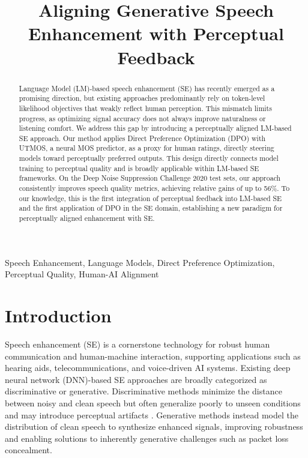 \documentclass{article}
\title{Aligning Generative Speech Enhancement with Perceptual Feedback}
\begin{document}
\ninept

\maketitle

\begin{abstract}
Language Model (LM)-based speech enhancement (SE) has recently emerged as a promising direction, but existing approaches predominantly rely on token-level likelihood objectives that weakly reflect human perception. This mismatch limits progress, as optimizing signal accuracy does not always improve naturalness or listening comfort. We address this gap by introducing a perceptually aligned LM-based SE approach. Our method applies Direct Preference Optimization (DPO) with UTMOS, a neural MOS predictor, as a proxy for human ratings, directly steering models toward perceptually preferred outputs. This design directly connects model training to perceptual quality and is broadly applicable within LM-based SE frameworks. On the Deep Noise Suppression Challenge 2020 test sets, our approach consistently improves speech quality metrics, achieving relative gains of up to 56\%. To our knowledge, this is the first integration of perceptual feedback into LM-based SE and the first application of DPO in the SE domain, establishing a new paradigm for perceptually aligned enhancement with SE.
\end{abstract}
%
\begin{keywords}
Speech Enhancement, Language Models, Direct Preference Optimization, Perceptual Quality, Human-AI Alignment
\end{keywords}
%
\section{Introduction}
\label{sec:intro}
Speech enhancement (SE) is a cornerstone technology for robust human communication and human-machine interaction, supporting applications such as hearing aids, telecommunications, and voice-driven AI systems. Existing deep neural network (DNN)-based SE approaches are broadly categorized as discriminative or generative. Discriminative methods \cite{fu2019metricGAN, li2024kan, 9023218, 9413512} minimize the distance between noisy and clean speech but often generalize poorly to unseen conditions and may introduce perceptual artifacts \cite{wang2019bridging, hou2022mismatch, 9747755}. Generative methods \cite{yao2025gense, zhang2025anyenhance} instead model the distribution of clean speech to synthesize enhanced signals, improving robustness and enabling solutions to inherently generative challenges such as packet loss concealment.  
\end{document}
